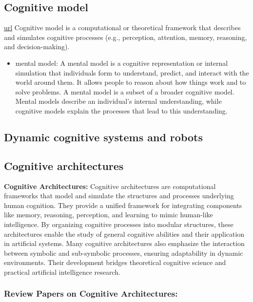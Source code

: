         
        
    \subsection{Cognitive model} \href{https://en.wikipedia.org/wiki/Cognitive_model#Dynamical_systems}{url} 
        Cognitive model is a computational or theoretical framework that describes and simulates cognitive processes (e.g., perception, attention, memory, reasoning, and decision-making).
        \begin{itemize}
            \item mental model: A mental model is a cognitive representation or internal simulation that individuals form to understand, predict, and interact with the world around them. It allows people to reason about how things work and to solve problems. A mental model is a subset of a broader cognitive model. Mental models describe an individual's internal understanding, while cognitive models explain the processes that lead to this understanding.
        \end{itemize}
    \subsection {Dynamic cognitive systems and robots}

    \subsection{Cognitive architectures}
        \textbf{Cognitive Architectures:} Cognitive architectures are computational frameworks that model and simulate the structures and processes underlying human cognition. They provide a unified framework for integrating components like memory, reasoning, perception, and learning to mimic human-like intelligence. By organizing cognitive processes into modular structures, these architectures enable the study of general cognitive abilities and their application in artificial systems. Many cognitive architectures also emphasize the interaction between symbolic and sub-symbolic processes, ensuring adaptability in dynamic environments. Their development bridges theoretical cognitive science and practical artificial intelligence research. \cite{anderson-1996-act-r, newell-1990-unified-theories-of-cognition, sun-2006-clarion-framework, franklin-2013-lida-theory}

        \subsubsection{Review Papers on Cognitive Architectures:}

